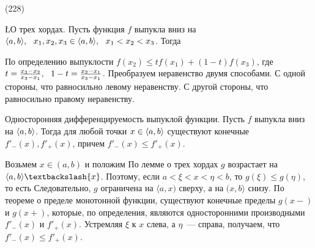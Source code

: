 (228)

\L \q О трех хордах. Пусть функция $f$ выпукла вниз на $\langle a, b \rangle,\ \  x_1, x_2, x_3 \in \langle a, b \rangle,\ \  x_1 < x_2 < x_3$. Тогда 

\D По определению выпуклости $f(x_2) \le tf(x_1) + (1 - t) f(x_3)$, где $t = \frac{x_3 - x_2}{x _3 - x_1},\ \  1-t = \frac{x_2 - x_1}{x_3 - x_1}$. Преобразуем неравенство двумя способами. С одной стороны,  что равносильно левому неравенству. С другой стороны,  что равносильно правому неравенству.

\T \q Односторонняя дифференцируемость выпуклой функции. Пусть $f$ выпукла вниз на $\langle a, b \rangle$. Тогда для любой точки $x \in \langle a, b \rangle$ существуют конечные $f'_-(x), f'_+(x)$, причем $f'_-(x) \le f'_+(x)$.

\D Возьмем $x \in (a, b)$ и положим  По лемме о трех хордах $g$ возрастает на $\ang ab\bsl\{x\}$. Поэтому, если $a < \xi < x < \eta < b$, то $g(\xi) \le g(\eta)$, то есть  Следовательно, $g$ ограничена на $\langle a, x)$ сверху, а на $(x, b\rangle$ снизу. По теореме о пределе монотонной функции, существуют конечные пределы $g(x-)$ и $g(x+)$, которые, по определения, являются односторонними производными $f'_-(x)$ и $f'_+(x)$. Устремляя $\xi$ к $x$ слева, а $\eta$~--- справа, получаем, что $f'_-(x) \le f'_+(x)$.